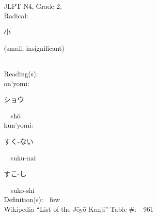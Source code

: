 \begin{multicols}{2}
{JLPT N4, Grade 2, \\Radical:\ \ {\begin{CJK}{UTF8}{min} 小 \end{CJK}} (small, insignificant) } \\
Reading(s):\ \ \\
{\hspace*{1em}}on'yomi:\ \ \\
{\hspace*{2em}}{\begin{CJK}{UTF8}{min} ショウ \end{CJK}}\ \ sh\=o\ \ \\
{\hspace*{1em}}kun'yomi:\ \ \\
{\hspace*{2em}}{\begin{CJK}{UTF8}{min} すく-ない \end{CJK}}\ \ suku-nai\ \ \\
{\hspace*{2em}}{\begin{CJK}{UTF8}{min} すこ-し \end{CJK}}\ \ suko-shi\ \ \\
Definition(s):\ \ few \\
Wikipedia ``List of the J\=oy\=o Kanji'' Table \#:\ \ 961 \\
\ \ \\
\end{multicols}



